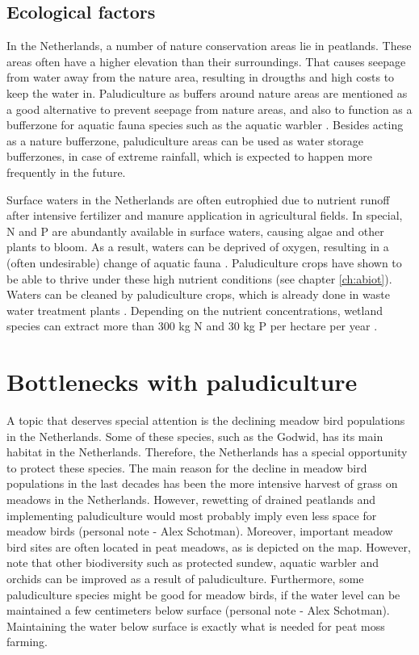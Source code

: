 {\begin{enumerate}
\subsection{Ecological factors}
In the Netherlands, a number of nature conservation areas lie in peatlands. These areas often have a higher elevation than their surroundings. That causes seepage from water away from the nature area, resulting in drougths and high costs to keep the water in. Paludiculture as buffers around nature areas are mentioned as a good alternative to prevent seepage from nature areas, and also to function as a bufferzone for aquatic fauna species such as the aquatic warbler \citep{van2013rewetting}. Besides acting as a nature bufferzone, paludiculture areas can be used as water storage bufferzones, in case of extreme rainfall, which is expected to happen more frequently in the future. 

Surface waters in the Netherlands are often eutrophied due to nutrient runoff after intensive fertilizer and manure application in agricultural fields. In special, N and P are abundantly available in surface waters, causing algae and other plants to bloom. As a result, waters can be deprived of oxygen, resulting in a (often undesirable) change of aquatic fauna \citep{waajen2014eutrophic}. Paludiculture crops have shown to be able to thrive under these high nutrient conditions (see chapter \ref{ch:abiot}). Waters can be cleaned by paludiculture crops, which is already done in waste water treatment plants \citep{}. Depending on the nutrient concentrations, wetland species can extract more than 300 kg N and 30 kg P per hectare per year \citep{Land2016}. 



\section{Bottlenecks with paludiculture}

A topic that deserves special attention is the declining meadow bird populations in the Netherlands. Some of these species, such as the Godwid, has its main habitat in the Netherlands. Therefore, the Netherlands has a special opportunity to protect these species. The main reason for the decline in meadow bird populations in the last decades has been the more intensive harvest of grass on meadows in the Netherlands. However, rewetting of drained peatlands and implementing paludiculture would most probably imply even less space for meadow birds (personal note - Alex Schotman). Moreover, important meadow bird sites are often located in peat meadows, as is depicted on the map. However, note that other biodiversity such as protected sundew, aquatic warbler and orchids can be improved as a result of paludiculture. Furthermore, some paludiculture species might be good for meadow birds, if the water level can be maintained a few centimeters below surface (personal note - Alex Schotman). Maintaining the water below surface is exactly what is needed for peat moss farming.


\end{enumerate}}
